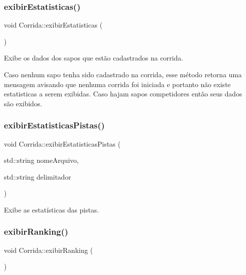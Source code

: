 \subsubsection{\texorpdfstring{exibir\+Estatisticas()}{exibirEstatisticas()}}
{\footnotesize\ttfamily void Corrida\+::exibir\+Estatisticas (\begin{DoxyParamCaption}{ }\end{DoxyParamCaption})}



Exibe os dados dos sapos que estão cadastrados na corrida. 

Caso nenhum sapo tenha sido cadastrado na corrida, esse método retorna uma mensagem avisando que nenhuma corrida foi iniciada e portanto não existe estatisticas a serem exibidas. Caso hajam sapos competidores então seus dados são exibidos. \mbox{\label{classCorrida_a666c49414c3c8f350aa1efffbca6816a}} 
\subsubsection{\texorpdfstring{exibir\+Estatisticas\+Pistas()}{exibirEstatisticasPistas()}}
{\footnotesize\ttfamily void Corrida\+::exibir\+Estatisticas\+Pistas (\begin{DoxyParamCaption}\item[{std\+::string}]{nome\+Arquivo,  }\item[{std\+::string}]{delimitador }\end{DoxyParamCaption})}



Exibe as estatísticas das pistas. 

\mbox{\label{classCorrida_a54889f450b35f0617b715a62c379d2cb}} 
\subsubsection{\texorpdfstring{exibir\+Ranking()}{exibirRanking()}}
{\footnotesize\ttfamily void Corrida\+::exibir\+Ranking (\begin{DoxyParamCaption}{ }\end{DoxyParamCaption})}



